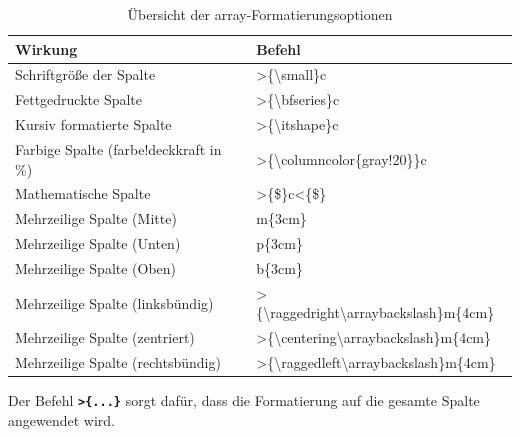 \begin{table}[H]
    \centering
    \renewcommand{\arraystretch}{1.3} %
    \setlength{\tabcolsep}{8pt} %
    \begin{tabular}{l|l}
        \toprule
        \textbf{Wirkung}                       & \textbf{Befehl}                                                      \\
        \midrule
        Schriftgröße der Spalte                & >\{\textbackslash small\}c                                           \\
        Fettgedruckte Spalte                   & >\{\textbackslash bfseries\}c                                        \\
        Kursiv formatierte Spalte              & >\{\textbackslash itshape\}c                                         \\
        Farbige Spalte (farbe!deckkraft in \%) & >\{\textbackslash columncolor\{gray!20\}\}c                          \\
        Mathematische Spalte                   & >\{\$\}c<\{\$\}                                                      \\
        \midrule
        Mehrzeilige Spalte (Mitte)             & m\{3cm\}                                                             \\
        Mehrzeilige Spalte (Unten)             & p\{3cm\}                                                             \\
        Mehrzeilige Spalte (Oben)              & b\{3cm\}                                                             \\
        Mehrzeilige Spalte (linksbündig)       & >\{\textbackslash raggedright\textbackslash arraybackslash\}m\{4cm\} \\
        Mehrzeilige Spalte (zentriert)         & >\{\textbackslash centering\textbackslash arraybackslash\}m\{4cm\}   \\
        Mehrzeilige Spalte (rechtsbündig)      & >\{\textbackslash raggedleft\textbackslash arraybackslash\}m\{4cm\}  \\
        \bottomrule
    \end{tabular}
    \caption{Übersicht der array-Formatierungsoptionen}
    \label{tab:array_formatierungen}
\end{table}

Der Befehl \textbf{\texttt{>\{...\}}} sorgt dafür, dass die Formatierung auf die gesamte Spalte angewendet wird.

